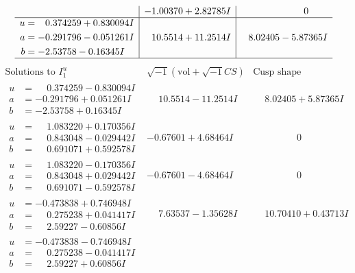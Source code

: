 \documentclass[1p]{elsarticle_modified}
\theoremstyle{definition}
\newcommand{\I}{\sqrt{-1}}
\begin{document}
$$\begin{array}{c|c|c}
 & -1.00370 + 2.82785 I & \phantom{-0.000000 } 0 \\ \hline\begin{aligned}
u &= \phantom{-}0.374259 + 0.830094 I \\
a &= -0.291796 - 0.051261 I \\
b &= -2.53758 - 0.16345 I\end{aligned}
 & \phantom{-}10.5514 + 11.2514 I & \phantom{-}8.02405 - 5.87365 I\\
 \hline 
 \end{array}$$\newpage$$\begin{array}{c|c|c}  
\text{Solutions to }I^u_{1}& \I (\text{vol} + \sqrt{-1}CS) & \text{Cusp shape}\\
 \hline 
\begin{aligned}
u &= \phantom{-}0.374259 - 0.830094 I \\
a &= -0.291796 + 0.051261 I \\
b &= -2.53758 + 0.16345 I\end{aligned}
 & \phantom{-}10.5514 - 11.2514 I & \phantom{-}8.02405 + 5.87365 I \\ \hline\begin{aligned}
u &= \phantom{-}1.083220 + 0.170356 I \\
a &= \phantom{-}0.843048 - 0.029442 I \\
b &= \phantom{-}0.691071 + 0.592578 I\end{aligned}
 & -0.67601 + 4.68464 I & \phantom{-0.000000 } 0 \\ \hline\begin{aligned}
u &= \phantom{-}1.083220 - 0.170356 I \\
a &= \phantom{-}0.843048 + 0.029442 I \\
b &= \phantom{-}0.691071 - 0.592578 I\end{aligned}
 & -0.67601 - 4.68464 I & \phantom{-0.000000 } 0 \\ \hline\begin{aligned}
u &= -0.473838 + 0.746948 I \\
a &= \phantom{-}0.275238 + 0.041417 I \\
b &= \phantom{-}2.59227 - 0.60856 I\end{aligned}
 & \phantom{-}7.63537 - 1.35628 I & \phantom{-}10.70410 + 0.43713 I \\ \hline\begin{aligned}
u &= -0.473838 - 0.746948 I \\
a &= \phantom{-}0.275238 - 0.041417 I \\
b &= \phantom{-}2.59227 + 0.60856 I\end{aligned}

\end{array}$$
\end{document}

